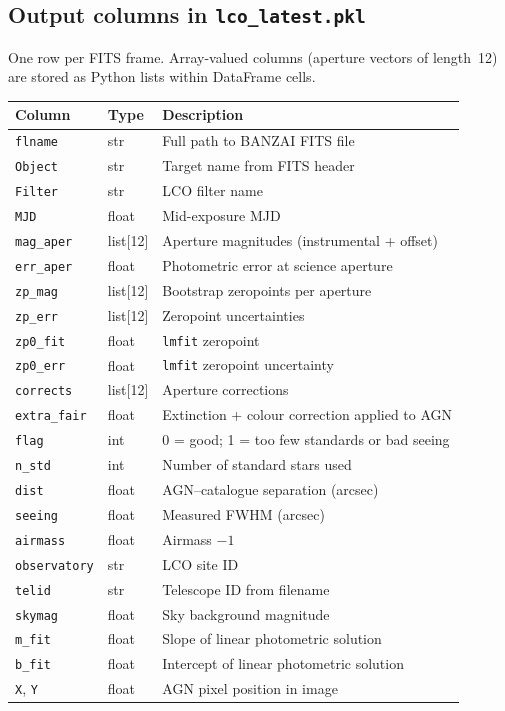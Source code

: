 \documentclass[12pt,a4paper]{article}
\begin{document}
\subsection{Output columns in \texttt{lco\_latest.pkl}}

One row per FITS frame.  Array-valued columns (aperture vectors of length~12) are stored
as Python lists within DataFrame cells.

\begin{center}
\small
\begin{tabular}{lll}
\toprule
Column & Type & Description \\
\midrule
\texttt{flname}      & str    & Full path to BANZAI FITS file \\
\texttt{Object}      & str    & Target name from FITS header \\
\texttt{Filter}      & str    & LCO filter name \\
\texttt{MJD}         & float  & Mid-exposure MJD \\
\texttt{mag\_aper}   & list[12] & Aperture magnitudes (instrumental + offset) \\
\texttt{err\_aper}   & float  & Photometric error at science aperture \\
\texttt{zp\_mag}     & list[12] & Bootstrap zeropoints per aperture \\
\texttt{zp\_err}     & list[12] & Zeropoint uncertainties \\
\texttt{zp0\_fit}    & float  & \texttt{lmfit} zeropoint \\
\texttt{zp0\_err}    & float  & \texttt{lmfit} zeropoint uncertainty \\
\texttt{corrects}    & list[12] & Aperture corrections \\
\texttt{extra\_fair} & float  & Extinction + colour correction applied to AGN \\
\texttt{flag}        & int    & 0 = good; 1 = too few standards or bad seeing \\
\texttt{n\_std}      & int    & Number of standard stars used \\
\texttt{dist}        & float  & AGN--catalogue separation (arcsec) \\
\texttt{seeing}      & float  & Measured FWHM (arcsec) \\
\texttt{airmass}     & float  & Airmass $-1$ \\
\texttt{observatory} & str    & LCO site ID \\
\texttt{telid}       & str    & Telescope ID from filename \\
\texttt{skymag}      & float  & Sky background magnitude \\
\texttt{m\_fit}      & float  & Slope of linear photometric solution \\
\texttt{b\_fit}      & float  & Intercept of linear photometric solution \\
\texttt{X}, \texttt{Y} & float & AGN pixel position in image \\
\bottomrule
\end{tabular}
\end{center}
\end{document}
